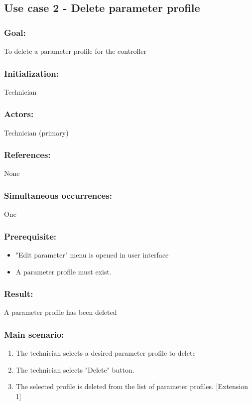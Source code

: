 
\subsection{Use case 2 - Delete parameter profile}
\subsubsection*{Goal:}
To delete a parameter profile for the controller

\subsubsection*{Initialization:}
Technician

\subsubsection*{Actors:}
Technician (primary)

\subsubsection*{References:}
None

\subsubsection*{Simultaneous occurrences:}
One

\subsubsection*{Prerequisite:}
\begin{itemize}
	\item "Edit parameter" menu is opened in user interface
	\item A parameter profile must exist.
\end{itemize}

\subsubsection*{Result:}
A parameter profile has been deleted

\subsubsection*{Main scenario:}
\begin{enumerate}
	\item The technician selects a desired parameter profile to delete
	\item The technician selects "Delete" button.
	\item The selected profile is deleted from the list of parameter profiles. [Extension 1]
\end{enumerate}	

